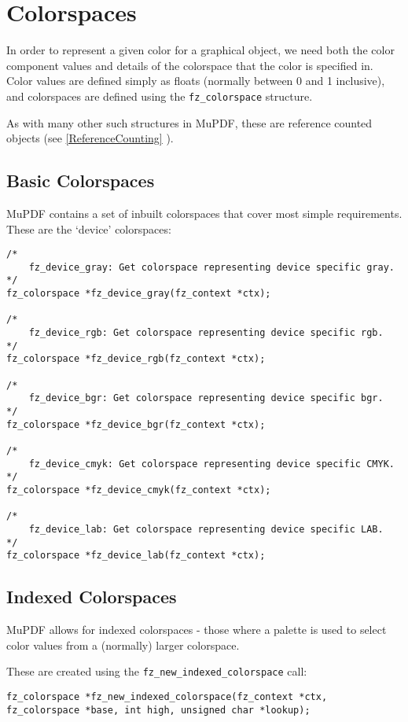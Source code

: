 \documentclass[oneside]{book}
\newcommand{\rjwref}[1] {\autoref{#1} \nameref{#1}}
\begin{document}
\section{Colorspaces}
\label{Colorspaces}

In order to represent a given color for a graphical object, we need both the color component values and details of the colorspace that the color is specified in. Color values are defined simply as floats (normally between 0 and 1 inclusive), and colorspaces are defined using the \texttt{fz\_colorspace} structure.

As with many other such structures in MuPDF, these are reference counted objects (see \rjwref{ReferenceCounting}).

\subsection{Basic Colorspaces}

MuPDF contains a set of inbuilt colorspaces that cover most simple requirements. These are the `device' colorspaces:

\begin{lstlisting}
/*
	fz_device_gray: Get colorspace representing device specific gray.
*/
fz_colorspace *fz_device_gray(fz_context *ctx);

/*
	fz_device_rgb: Get colorspace representing device specific rgb.
*/
fz_colorspace *fz_device_rgb(fz_context *ctx);

/*
	fz_device_bgr: Get colorspace representing device specific bgr.
*/
fz_colorspace *fz_device_bgr(fz_context *ctx);

/*
	fz_device_cmyk: Get colorspace representing device specific CMYK.
*/
fz_colorspace *fz_device_cmyk(fz_context *ctx);

/*
	fz_device_lab: Get colorspace representing device specific LAB.
*/
fz_colorspace *fz_device_lab(fz_context *ctx);
\end{lstlisting}

\subsection{Indexed Colorspaces}

MuPDF allows for indexed colorspaces - those where a palette is used to select color values from a (normally) larger colorspace.

These are created using the \texttt{fz\_new\_indexed\_colorspace} call:

\begin{lstlisting}
fz_colorspace *fz_new_indexed_colorspace(fz_context *ctx, fz_colorspace *base, int high, unsigned char *lookup);
\end{lstlisting}
\end{document}
